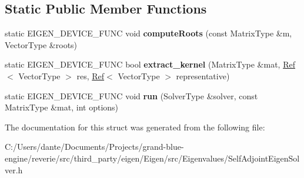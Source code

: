 \subsection*{Static Public Member Functions}
\begin{DoxyCompactItemize}
\item 
\mbox{\label{struct_eigen_1_1internal_1_1direct__selfadjoint__eigenvalues_3_01_solver_type_00_013_00_01false_01_4_abb216c5ee047da4b4d7b225948b5d666}} 
static E\+I\+G\+E\+N\+\_\+\+D\+E\+V\+I\+C\+E\+\_\+\+F\+U\+NC void {\bfseries compute\+Roots} (const Matrix\+Type \&m, Vector\+Type \&roots)
\item 
\mbox{\label{struct_eigen_1_1internal_1_1direct__selfadjoint__eigenvalues_3_01_solver_type_00_013_00_01false_01_4_acd33edc4fec6df2b006ffcdd610f0a3b}} 
static E\+I\+G\+E\+N\+\_\+\+D\+E\+V\+I\+C\+E\+\_\+\+F\+U\+NC bool {\bfseries extract\+\_\+kernel} (Matrix\+Type \&mat, \mbox{\hyperlink{class_eigen_1_1_ref}{Ref}}$<$ Vector\+Type $>$ res, \mbox{\hyperlink{class_eigen_1_1_ref}{Ref}}$<$ Vector\+Type $>$ representative)
\item 
\mbox{\label{struct_eigen_1_1internal_1_1direct__selfadjoint__eigenvalues_3_01_solver_type_00_013_00_01false_01_4_a9bba7b5bd5aeb6d3ede0cd70ed18f231}} 
static E\+I\+G\+E\+N\+\_\+\+D\+E\+V\+I\+C\+E\+\_\+\+F\+U\+NC void {\bfseries run} (Solver\+Type \&solver, const Matrix\+Type \&mat, int options)
\end{DoxyCompactItemize}


The documentation for this struct was generated from the following file\+:\begin{DoxyCompactItemize}
\item 
C\+:/\+Users/dante/\+Documents/\+Projects/grand-\/blue-\/engine/reverie/src/third\+\_\+party/eigen/\+Eigen/src/\+Eigenvalues/Self\+Adjoint\+Eigen\+Solver.\+h\end{DoxyCompactItemize}
